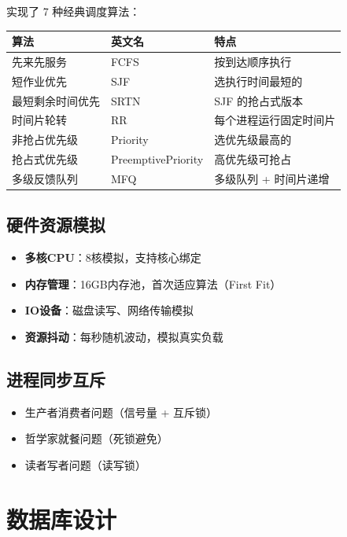 \documentclass[12pt,a4paper]{article}
\begin{document}
实现了 7 种经典调度算法：

\begin{table}[H]
\centering
\begin{tabular}{lll}
\toprule
\textbf{算法} & \textbf{英文名} & \textbf{特点} \\
\midrule
先来先服务 & FCFS & 按到达顺序执行 \\
短作业优先 & SJF & 选执行时间最短的 \\
最短剩余时间优先 & SRTN & SJF 的抢占式版本 \\
时间片轮转 & RR & 每个进程运行固定时间片 \\
非抢占优先级 & Priority & 选优先级最高的 \\
抢占式优先级 & PreemptivePriority & 高优先级可抢占 \\
多级反馈队列 & MFQ & 多级队列 + 时间片递增 \\
\bottomrule
\end{tabular}
\end{table}

\subsection{硬件资源模拟}

\begin{itemize}
    \item \textbf{多核CPU}：8核模拟，支持核心绑定
    \item \textbf{内存管理}：16GB内存池，首次适应算法（First Fit）
    \item \textbf{IO设备}：磁盘读写、网络传输模拟
    \item \textbf{资源抖动}：每秒随机波动，模拟真实负载
\end{itemize}

\subsection{进程同步互斥}

\begin{itemize}
    \item 生产者消费者问题（信号量 + 互斥锁）
    \item 哲学家就餐问题（死锁避免）
    \item 读者写者问题（读写锁）
\end{itemize}

\section{数据库设计}
\end{document}
